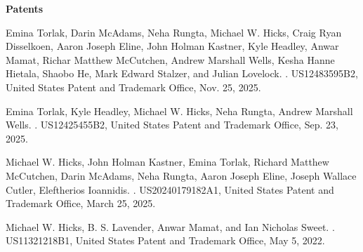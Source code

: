 \documentclass[11pt]{article}
\begin{document}
\begin{description}
\setlength{\labelsep}{0ex}
\setlength{\itemsep}{-0.5ex}


\item {\bf\textsf Patents}

\item Emina Torlak, Darin McAdams, Neha Rungta, Michael W. Hicks, Craig Ryan Disselkoen, Aaron Joseph Eline, John Holman Kastner, Kyle Headley, Anwar Mamat, Richar Matthew McCutchen, Andrew Marshall Wells, Kesha Hanne Hietala, Shaobo He, Mark Edward Stalzer, and Julian Lovelock.
  .
  US12483595B2, United States Patent and Trademark Office, Nov. 25, 2025.

\item Emina Torlak, Kyle Headley, Michael W. Hicks, Neha Rungta, Andrew Marshall Wells. 
  . 
  US12425455B2, United States Patent and Trademark Office, Sep. 23, 2025. 

\item Michael W. Hicks, John Holman Kastner, Emina Torlak, Richard
  Matthew McCutchen, Darin McAdams, Neha Rungta, Aaron Joseph Eline,
  Joseph Wallace Cutler, Eleftherios
  Ioannidis. . US20240179182A1, United States Patent and Trademark Office, March 25,
  2025. 

\item Michael W. Hicks, B. S. Lavender, Anwar Mamat, and Ian Nicholas
  Sweet. .
  US11321218B1, United States Patent and Trademark Office, May 5,
  2022.

\end{description}
\end{document}
